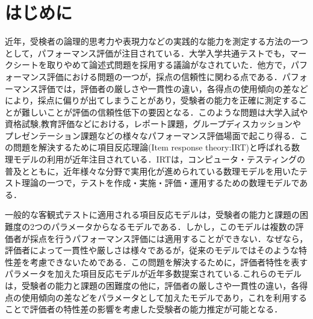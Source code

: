\documentclass[a4paper,11pt,oneside,openany]{jsbook}
\begin{document}
\newpage
\chapter{はじめに}
近年，受検者の論理的思考力や表現力などの実践的な能力を測定する方法の一つとして，パフォーマンス評価が注目されている．大学入学共通テストでも，マークシートを取りやめて論述式問題を採用する議論がなされていた．他方で，パフォーマンス評価における問題の一つが，採点の信頼性に関わる点である．パフォーマンス評価では，評価者の厳しさや一貫性の違い，各得点の使用傾向の差などにより，採点に偏りが出てしまうことがあり，受験者の能力を正確に測定することが難しいことが評価の信頼性低下の要因となる．このような問題は大学入試や資格試験,教育評価などにおける，レポート課題，グループディスカッションやプレゼンテーション課題などの様々なパフォーマンス評価場面で起こり得る．この問題を解決するために項目反応理論(Item response theory:IRT)\cite{IRTtext,IRTLord}と呼ばれる数理モデルの利用が近年注目されている．IRTは，コンピュータ・テスティングの普及とともに，近年様々な分野で実用化が進められている数理モデルを用いたテスト理論の一つで，テストを作成・実施・評価・運用するための数理モデルである．

一般的な客観式テストに適用される項目反応モデルは，受験者の能力と課題の困難度の2つのパラメータからなるモデル\cite{rash}である．しかし，このモデルは複数の評価者が採点を行うパフォーマンス評価には適用することができない．なぜなら，評価者によって一貫性や厳しさは様々であるが，従来のモデルではそのような特性差を考慮できないためである．この問題を解決するために，評価者特性を表すパラメータを加えた項目反応モデルが近年多数提案されている\cite{raterRash,rater2,rater3,raterGPCM}.これらのモデルは，受験者の能力と課題の困難度の他に，評価者の厳しさや一貫性の違い，各得点の使用傾向の差などをパラメータとして加えたモデルであり，これを利用することで評価者の特性差の影響を考慮した受験者の能力推定が可能となる．
\end{document}
